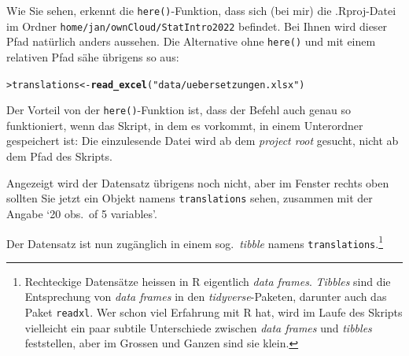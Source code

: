 \documentclass[oneside, 10pt]{book}\usepackage[]{graphicx}\usepackage[]{xcolor}
\makeatletter
\newcommand{\hlstr}[1]{\textcolor[rgb]{0.192,0.494,0.8}{#1}}%
\newcommand{\hlstd}[1]{\textcolor[rgb]{0.345,0.345,0.345}{#1}}%
\newcommand{\hlkwb}[1]{\textcolor[rgb]{0.69,0.353,0.396}{#1}}%
\newcommand{\hlkwd}[1]{\textcolor[rgb]{0.737,0.353,0.396}{\textbf{#1}}}%
\newenvironment{kframe}{%
 \def\at@end@of@kframe{}%
 \ifinner\ifhmode%
  \def\at@end@of@kframe{\end{minipage}}%
  \begin{minipage}{\columnwidth}%
 \fi\fi%
 \def\FrameCommand##1{\hskip\@totalleftmargin \hskip-\fboxsep
 \colorbox{shadecolor}{##1}\hskip-\fboxsep
     \hskip-\linewidth \hskip-\@totalleftmargin \hskip\columnwidth}%
 \MakeFramed {\advance\hsize-\width
   \@totalleftmargin\z@ \linewidth\hsize
   \@setminipage}}%
 {\par\unskip\endMakeFramed%
 \at@end@of@kframe}
\newenvironment{knitrout}{}{} %
\makeatother
\begin{document}
Wie Sie sehen, erkennt die \texttt{here()}-Funktion, dass sich (bei mir)
die .Rproj-Datei im Ordner \texttt{home/jan/ownCloud/StatIntro2022}
befindet. Bei Ihnen wird dieser Pfad natürlich anders aussehen. 
Die Alternative ohne \texttt{here()} und mit einem relativen Pfad sähe übrigens so aus:
\begin{knitrout}
\color{fgcolor}\begin{kframe}
\begin{alltt}
\hlstd{> }\hlstd{translations} \hlkwb{<-} \hlkwd{read_excel}\hlstd{(}\hlstr{"data/uebersetzungen.xlsx"}\hlstd{)}
\end{alltt}
\end{kframe}
\end{knitrout}
Der Vorteil von der \texttt{here()}-Funktion ist,
dass der Befehl auch genau so funktioniert, wenn das
Skript, in dem es vorkommt, in einem Unterordner gespeichert ist:
Die einzulesende Datei wird ab dem \textit{project root} gesucht,
nicht ab dem Pfad des Skripts.

Angezeigt wird der Datensatz übrigens noch nicht, aber im Fenster rechts oben
sollten Sie jetzt ein Objekt namens \texttt{translations} sehen,
zusammen mit der Angabe `20 obs.\ of 5 variables'.

Der Datensatz ist nun zugänglich in einem sog.\ \textit{tibble} namens \texttt{translations}.\footnote{Rechteckige Datensätze heissen in R eigentlich \textit{data frames}. \textit{Tibbles} sind die Entsprechung von \textit{data frames} in den \textit{tidyverse}-Paketen, darunter auch das Paket \texttt{readxl}. Wer schon viel Erfahrung mit R hat, wird im Laufe des Skripts vielleicht ein paar subtile Unterschiede zwischen \textit{data frames} und \textit{tibbles} feststellen, aber im Grossen und Ganzen sind sie klein.\label{fn:tibble}}

\medskip
\end{document}
